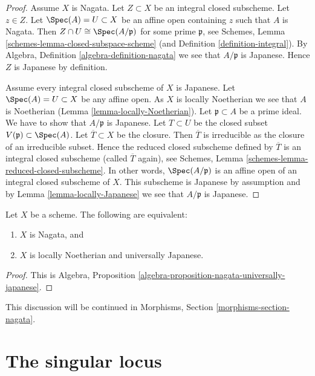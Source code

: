 \begin{proof}
Assume $X$ is Nagata. Let $Z \subset X$ be an integral closed subscheme.
Let $z \in Z$.
Let $\Spec(A) = U \subset X$ be an affine open containing $z$
such that $A$ is Nagata. Then
$Z \cap U \cong \Spec(A/\mathfrak p)$ for some prime $\mathfrak p$,
see Schemes, Lemma \ref{schemes-lemma-closed-subspace-scheme} (and
Definition \ref{definition-integral}). By
Algebra, Definition \ref{algebra-definition-nagata} we see
that $A/\mathfrak p$ is Japanese. Hence $Z$ is Japanese by definition.

\medskip\noindent
Assume every integral closed subscheme of $X$ is Japanese.
Let $\Spec(A) = U \subset X$ be any affine open.
As $X$ is locally Noetherian we see that $A$ is Noetherian
(Lemma \ref{lemma-locally-Noetherian}). Let $\mathfrak p \subset A$
be a prime ideal. We have to show that $A/\mathfrak p$ is Japanese.
Let $T \subset U$ be the closed subset $V(\mathfrak p) \subset \Spec(A)$.
Let $\overline{T} \subset X$ be the closure. Then $\overline{T}$ is
irreducible as the closure of an irreducible subset. Hence the reduced
closed subscheme defined by $\overline{T}$ is an integral closed
subscheme (called $\overline{T}$ again), see
Schemes, Lemma \ref{schemes-lemma-reduced-closed-subscheme}.
In other words, $\Spec(A/\mathfrak p)$ is an affine
open of an integral closed subscheme of $X$. This subscheme is Japanese
by assumption and by Lemma \ref{lemma-locally-Japanese} we see that
$A/\mathfrak p$ is Japanese.
\end{proof}

\begin{lemma}
\label{lemma-nagata-universally-Japanese}
Let $X$ be a scheme.
The following are equivalent:
\begin{enumerate}
\item $X$ is Nagata, and
\item $X$ is locally Noetherian and universally Japanese.
\end{enumerate}
\end{lemma}

\begin{proof}
This is
Algebra, Proposition \ref{algebra-proposition-nagata-universally-japanese}.
\end{proof}

\noindent
This discussion will be continued in
Morphisms, Section \ref{morphisms-section-nagata}.





\section{The singular locus}
\label{section-singular-locus}

